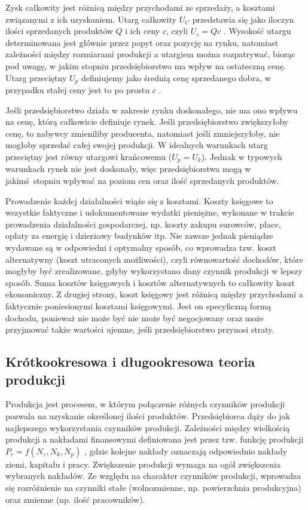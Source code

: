 \documentclass[12pt]{extarticle}
\begin{document}
Zysk całkowity jest różnicą między przychodami ze sprzedaży, a kosztami związanymi z ich uzyskaniem. Utarg całkowity $ U_C $ przedstawia się jako iloczyn ilości sprzedanych produktów $ Q $ i ich ceny $ c $, czyli $ U_c = Qc $ . Wysokość utargu determinowana jest głównie przez popyt oraz pozycję na rynku, natomiast zależności między rozmiarami produkcji a utargiem można rozpatrywać, biorąc pod uwagę, w jakim stopniu przedsiębiorstwo ma wpływ na ostateczną cenę. Utarg przeciętny $ U_p $ definiujemy jako średnią cenę sprzedanego dobra, w przypadku stałej ceny jest to po prostu $ c $ .

Jeśli przedsiębiorstwo działa w zakresie rynku doskonałego, nie ma ono wpływu na cenę, którą całkowicie definiuje rynek. Jeśli przedsiębiorstwo zwiększyłoby cenę, to nabywcy zmieniliby producenta, natomiast jeśli zmniejszyłoby, nie mogłoby sprzedać całej swojej produkcji. W idealnych warunkach utarg przeciętny jest równy utargowi krańcowemu ($ U_p = U_k $). Jednak w typowych warunkach rynek nie jest doskonały, więc przedsiębiorstwa mogą w jakimś stopniu wpływać na poziom cen oraz ilość sprzedanych produktów.

Prowadzenie każdej działalności wiąże się z kosztami. Koszty księgowe to wszystkie faktyczne i udokumentowane wydatki pieniężne, wykonane w trakcie prowadzenia działalności gospodarczej, np. koszty zakupu surowców, płace, opłaty za energię i dzierżawy budynków itp. Nie zawsze jednak pieniądze wydawane są w odpowiedni i optymalny sposób, co wprowadza tzw. koszt alternatywny (koszt utraconych możliwości), czyli równowartość dochodów, które mogłyby być zrealizowane, gdyby wykorzystano dany czynnik produkcji w lepszy sposób. Suma kosztów księgowych i kosztów alternatywnych to całkowity koszt ekonomiczny. Z drugiej strony, koszt księgowy jest różnicą między przychodami a faktycznie poniesionymi kosztami księgowymi. Jest on specyficzną formą dochodu, ponieważ nie może być nie może być negocjowany oraz może przyjmować także wartości ujemne, jeśli przedsiębiorstwo przynosi straty.

\subsection{Krótkookresowa i długookresowa teoria produkcji}

Produkcja jest procesem, w którym połączenie różnych czynników produkcji pozwala na uzyskanie określonej ilości produktów. Przedsiębiorca dąży do jak najlepszego wykorzystania czynników produkcji. Zależności między wielkością produkcji a nakładami finansowymi definiowana jest przez tzw. funkcję produkcji $ P_c = f(N_z, N_k, N_p) $ , gdzie kolejne nakłady oznaczają odpowiednio nakłady ziemi, kapitału i pracy. Zwiększenie produkcji wymaga na ogół zwiększenia wybranych nakładów. Ze względu na charakter czynników produkcji, wprowadza się rozróżnienie na czynniki stałe (wolnozmienne, np. powierzchnia produkcyjna) oraz zmienne (np. ilość pracowników).
\end{document}
